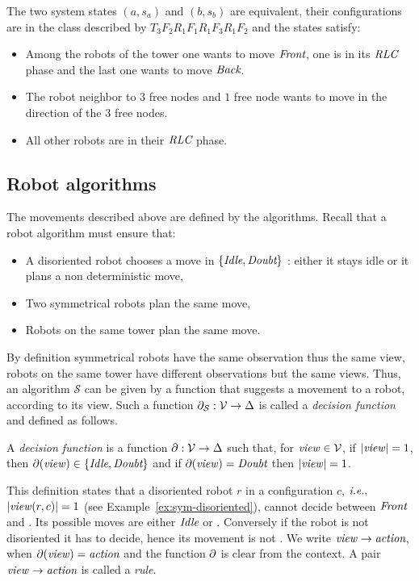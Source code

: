 \begin{example}
The two system states $(a, s_a)$ and $(b, s_b)$ are equivalent, their configurations are in
 the class described by $T_3 F_2 R_1 F_1 R_1 F_3 R_1 F_2$ and the states satisfy:
\begin{itemize}%
\item Among the robots of the tower one wants to move $\textit{Front}$, one is in its $\textit{RLC}$ phase and the 
last one wants to move $\textit{Back}$.
\item The robot neighbor to $3$ free nodes
and $1$ free node wants to move in the direction of the $3$ free nodes.
\item All other robots are in their $\textit{RLC}$ phase.
\end{itemize}

\end{example}

\subsection{Robot algorithms}
The movements described above are defined by the algorithms. 
Recall  that a robot algorithm must ensure that: 
\begin{itemize}
\item A disoriented robot chooses a move in $\{\textit{Idle}, \textit{Doubt}\}$ : either it stays idle or it plans a non deterministic move,
\item Two symmetrical robots plan the same move,
\item Robots on the same tower plan the same move.
\end{itemize}
By definition symmetrical robots have the same observation thus the same view, 
robots on the same tower have different observations but the same views.
Thus, an algorithm $\mathcal{S}$ can be given by a function that suggests a  
movement to a robot, according to its view. Such a function $\partial_\mathcal{S}:\mathcal{V}\rightarrow \Delta$ 
is called a \emph{decision function} and defined as follows.

\begin{definition} %
\label{def:decisionFunction}
A \emph{decision function} is a function $\partial:\mathcal{V}\rightarrow \Delta$ such that, for $\mathit{view} \in \mathcal{V}$, if $|\mathit{view}|=1$, then
$\partial(\mathit{view})\in\{\textit{Idle},\textit{Doubt}\}$ and if $\partial(\mathit{view})=\textit{Doubt}$ then $|\mathit{view}|=1$.
\end{definition}
This definition states that a disoriented robot $r$ in a configuration 
$c$, $\textit{i.e.},$ $|\mathit{view}(r,c)|=1$ (see Example~\ref{ex:sym-disoriented}), cannot 
decide between $\textit{Front}$ and \counterclockwise.
Its possible moves are either $\textit{Idle}$ or \Doubt.
Conversely if the robot is not disoriented it has to decide,
hence its movement is not \Doubt. We write $\mathit{view} \to \textit{action}$, when 
$\partial(\mathit{view})= \textit{action}$ and the function $\partial$ is clear from the context.  
A pair $\mathit{view} \to \textit{action}$ is called a \emph{rule}.


